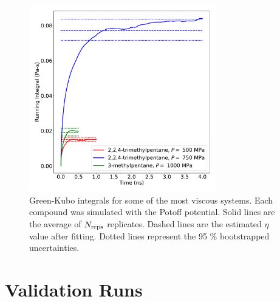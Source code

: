 \documentclass[preprint,review,12pt]{elsarticle}
\begin{document}
    \begin{figure}[htb!]
    	\centering
    	\includegraphics[width=3.2in]{most_viscous_systems.pdf}
    	\caption{Green-Kubo integrals for some of the most viscous systems. Each compound was simulated with the Potoff potential. Solid lines are the average of $N_{\rm reps}$ replicates. Dashed lines are the estimated $\eta$ value after fitting. Dotted lines represent the 95 \% bootstrapped uncertainties.}
    	\label{fig:most_viscous}
    \end{figure} 
    
    
%    
%    
	
	
	\section{Validation Runs} \label{Validation Runs}
	
\end{document}
